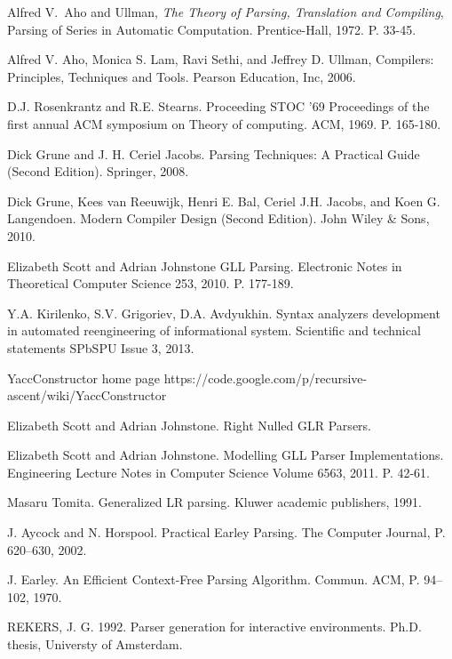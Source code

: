 \documentclass{matmex-diploma-custom}
\begin{document}
\begin{thebibliography}{1}

Alfred V.~Aho and Ullman, \emph{The Theory of Parsing, Translation and Compiling}, Parsing of Series in Automatic Computation. \relax Prentice-Hall, 1972. P. 33-45.

Alfred V. Aho, Monica S. Lam, Ravi Sethi, and Jeffrey D. Ullman, Compilers: Principles, Techniques and Tools. Pearson Education, Inc, 2006.

D.J. Rosenkrantz and R.E. Stearns. Proceeding STOC '69 Proceedings of the first annual ACM symposium on Theory of computing. ACM, 1969. P. 165-180.

Dick Grune and J. H. Ceriel Jacobs. Parsing Techniques: A Practical Guide (Second Edition). Springer, 2008.

Dick Grune, Kees van Reeuwijk, Henri E. Bal, Ceriel J.H. Jacobs, and Koen G. Langendoen. Modern Compiler Design (Second Edition). John Wiley \& Sons, 2010.

Elizabeth Scott and Adrian Johnstone GLL Parsing. Electronic Notes in Theoretical Computer Science 253, 2010. P. 177-189.

Y.A. Kirilenko, S.V. Grigoriev, D.A. Avdyukhin. Syntax analyzers development in automated reengineering of informational system. Scientific and technical statements SPbSPU Issue 3, 2013.

\relax YaccConstructor home page https://code.google.com/p/recursive-ascent/wiki/YaccConstructor

Elizabeth Scott and Adrian Johnstone. Right Nulled GLR Parsers.

Elizabeth Scott and Adrian Johnstone. Modelling GLL Parser Implementations. Engineering Lecture Notes in Computer Science Volume 6563, 2011. P. 42-61.

Masaru Tomita. Generalized LR parsing. Kluwer academic publishers, 1991.

J. Aycock and N. Horspool. Practical Earley Parsing. The Computer Journal, P. 620–630, 2002.

J. Earley. An Eﬃcient Context-Free Parsing Algorithm. Commun. ACM, P. 94–102, 1970.

REKERS, J. G. 1992. Parser generation for interactive environments. Ph.D. thesis, Universty of Amsterdam.


\end{thebibliography}
\end{document}

